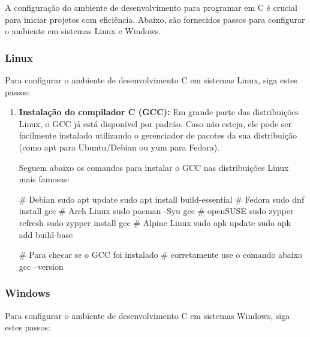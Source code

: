 A configuração do ambiente de desenvolvimento para programar em C é crucial 
para iniciar projetos com eficiência. Abaixo, são fornecidos passos para 
configurar o ambiente em sistemas Linux e Windows.

\subsubsection{Linux}

Para configurar o ambiente de desenvolvimento C em sistemas Linux, siga estes 
passos:

\begin{enumerate}
    \item \textbf{Instalação do compilador C (GCC):} 
        Em grande parte das distribuições Linux, o GCC já está disponível por 
        padrão. Caso não esteja, ele pode ser facilmente instalado utilizando 
        o gerenciador de pacotes da sua distribuição (como apt para 
        Ubuntu/Debian ou yum para Fedora).
        
        Seguem abaixo os comandos para instalar o GCC nas distribuições Linux 
        mais famosas:

        \begin{textbox}
        # Debian
        sudo apt update
        sudo apt install build-essential
        # Fedora
        sudo dnf install gcc
        # Arch Linux
        sudo pacman -Syu gcc
        # openSUSE
        sudo zypper refresh
        sudo zypper install gcc
        # Alpine Linux
        sudo apk update
        sudo apk add build-base

        # Para checar se o GCC foi instalado 
        # corretamente use o comando abaixo
        gcc --version
        \end{textbox}
\end{enumerate}

\subsubsection{Windows}

Para configurar o ambiente de desenvolvimento C em sistemas Windows, siga 
estes passos:

